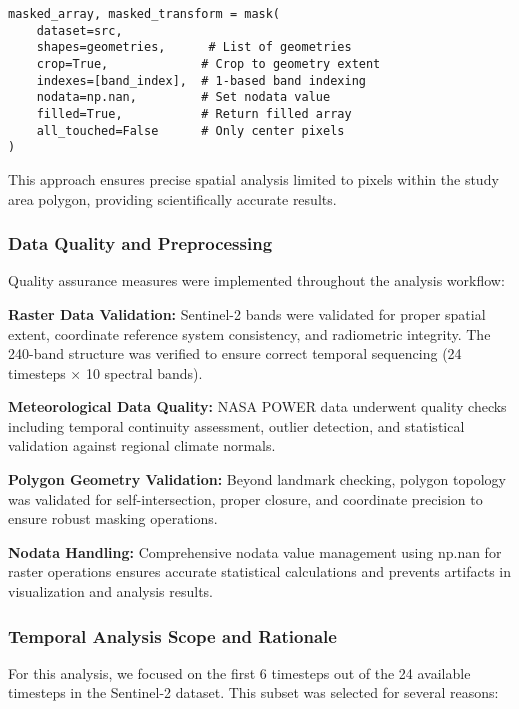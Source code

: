 \documentclass[a4paper,12pt]{article}
\begin{document}
\begin{lstlisting}[caption=Correct rasterio.mask implementation]
masked_array, masked_transform = mask(
    dataset=src,
    shapes=geometries,      # List of geometries
    crop=True,             # Crop to geometry extent  
    indexes=[band_index],  # 1-based band indexing
    nodata=np.nan,         # Set nodata value
    filled=True,           # Return filled array
    all_touched=False      # Only center pixels
)
\end{lstlisting}

This approach ensures precise spatial analysis limited to pixels within the
study area polygon, providing scientifically accurate results.

\subsubsection{Data Quality and Preprocessing}

Quality assurance measures were implemented throughout the analysis workflow:

\textbf{Raster Data Validation:} Sentinel-2 bands were validated for proper
spatial extent, coordinate reference system consistency, and radiometric
integrity. The 240-band structure was verified to ensure correct temporal
sequencing (24 timesteps × 10 spectral bands).

\textbf{Meteorological Data Quality:} NASA POWER data underwent quality checks
including temporal continuity assessment, outlier detection, and statistical
validation against regional climate normals.

\textbf{Polygon Geometry Validation:} Beyond landmark checking, polygon
topology was validated for self-intersection, proper closure, and coordinate
precision to ensure robust masking operations.

\textbf{Nodata Handling:} Comprehensive nodata value management using np.nan
for raster operations ensures accurate statistical calculations and prevents
artifacts in visualization and analysis results.

\subsubsection{Temporal Analysis Scope and Rationale}

For this analysis, we focused on the first 6 timesteps out of the 24 available
timesteps in the Sentinel-2 dataset. This subset was selected for several
reasons:
\end{document}
